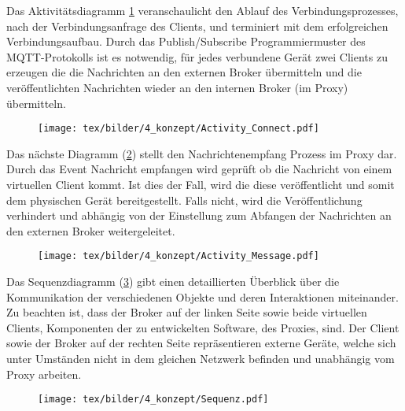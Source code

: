    Das Aktivitätsdiagramm \ref{fig:aktivitaetsdiagramm_connect} veranschaulicht den Ablauf des Verbindungsprozesses, nach der Verbindungsanfrage des Clients, und terminiert mit dem erfolgreichen Verbindungsaufbau.
    Durch das Publish/Subscribe Programmiermuster des \ac{MQTT}-Protokolls ist es notwendig, für jedes verbundene Gerät zwei Clients zu erzeugen die die Nachrichten an den externen Broker übermitteln und die veröffentlichten Nachrichten wieder an den internen Broker (im Proxy) übermitteln.
    
    \begin{figure}[!h]%
        \centering
        \texttt{[image: tex/bilder/4\_konzept/Activity\_Connect.pdf]}
        \label{fig:aktivitaetsdiagramm_connect}
    \end{figure}
    \newpage
    Das nächste Diagramm (\ref{fig:aktivitaetsdiagramm_message}) stellt den Nachrichtenempfang Prozess im Proxy dar.
    Durch das Event \glqq Nachricht empfangen\grqq{} wird geprüft ob die Nachricht von einem virtuellen Client kommt. Ist dies der Fall, wird die diese veröffentlicht und somit dem physischen Gerät bereitgestellt. Falls nicht, wird die Veröffentlichung verhindert und abhängig von der Einstellung zum Abfangen der Nachrichten an den externen Broker weitergeleitet.
    
    \begin{figure}[!h]%
        \centering
        \texttt{[image: tex/bilder/4\_konzept/Activity\_Message.pdf]}
        \label{fig:aktivitaetsdiagramm_message}
    \end{figure}
    
    Das Sequenzdiagramm (\ref{fig:sequenzdiagramm}) gibt einen detaillierten Überblick über die Kommunikation der verschiedenen Objekte und deren Interaktionen miteinander.
    Zu beachten ist, dass der Broker auf der linken Seite sowie beide virtuellen Clients, Komponenten der zu entwickelten Software, des Proxies, sind.
    Der Client sowie der Broker auf der rechten Seite repräsentieren externe Geräte, welche sich unter Umständen nicht in dem gleichen Netzwerk befinden und unabhängig vom Proxy arbeiten.
    
    \begin{figure}[!h]%
        \centering
        \texttt{[image: tex/bilder/4\_konzept/Sequenz.pdf]}
        \label{fig:sequenzdiagramm}
    \end{figure}
